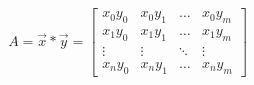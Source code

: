 \documentclass[10pt]{article}
\begin{document}
\begin{align*}A = \vec{x} * \vec{y} = \begin{bmatrix} x_0y_0 & x_0y_1 & \hdots & x_0y_m \\ x_1y_0 & x_1y_1 & \hdots & x_1y_m \\ \vdots & \vdots & \ddots & \vdots \\x_ny_0 & x_ny_1 & \hdots & x_ny_m \end{bmatrix}

\end{align*}
\end{document}
